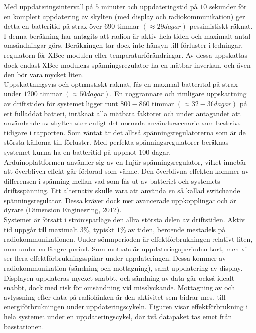 \documentclass[a4paper,11pt]{article}
\begin{document}
Med uppdateringsintervall på $5$ minuter och uppdateringstid på $10$ sekunder för en komplett uppdatering av skylten (med display och radiokommunikation) ger detta en batteritid på strax över $690$ timmar $(\approx 29 dagar)$ pessimistiskt räknat. I denna beräkning har antagits att radion är aktiv hela tiden och maximalt antal omsändningar görs. Beräkningen tar dock inte hänsyn till förluster i ledningar, regulatorn för XBee-modulen eller temperaturförändringar. Av dessa uppskattas dock endast XBee-modulens spänningsregulator ha en mätbar inverkan, och även den bör vara mycket liten. \\

Uppskattningsvis och optimistiskt räknat, fås en maximal batteritid på strax under $1200$ timmar $(\approx 50 dagar)$. En noggrannare och rimligare uppskattning av driftstiden för systemet ligger runt $800-860$ timmar $(\approx 32-36 dagar)$ på ett fulladdat batteri, inräknat alla mätbara faktorer och under antagandet att användande av skylten sker enligt det normala användarscenario som beskrivs tidigare i rapporten. Som väntat är det alltså spänningsregulatorerna som är de största källorna till förluster. Med perfekta spänningsregulatorer beräknas systemet kunna ha en batteritid på uppmot $100$ dagar. \\

Arduinoplattformen använder sig av en linjär spänningsregulator, vilket innebär att överbliven effekt går förlorad som värme. Den överblivna effekten kommer av differensen i spänning mellan vad som fås ut av batteriet och systemets driftsspänning. Ett alternativ skulle vara att använda en så kallad switchande spänningsregulator. Dessa kräver dock mer avancerade uppkopplingar och är dyrare \hyperref[dimension]{(Dimension Engineering, 2012)}. \\

Systemet är försatt i strömsparläge den allra största delen av driftstiden. Aktiv tid uppgår till maximalt $3\%$, typiskt $1\%$ av tiden, beroende mestadels på radiokommunikationen. Under sömnperioden är effektförbrukningen relativt liten, men under en längre period. Som motsats är uppdateringsperioden kort, men vi ser flera effektförbrukningsspikar under uppdateringen. Dessa kommer av radiokommunikation (sändning och mottagning), samt uppdatering av display. Displayen uppdateras mycket snabbt, och sändning av data går också idealt snabbt, dock med risk för omsändning vid misslyckande. Mottagning av och avlyssning efter data på radiolänken är den aktivitet som bidrar mest till energiförbrukningen under uppdateringscykeln. Figuren visar effektförbrukning i hela systemet under en uppdateringscykel, där två datapaket tas emot från basstationen.
\end{document}
